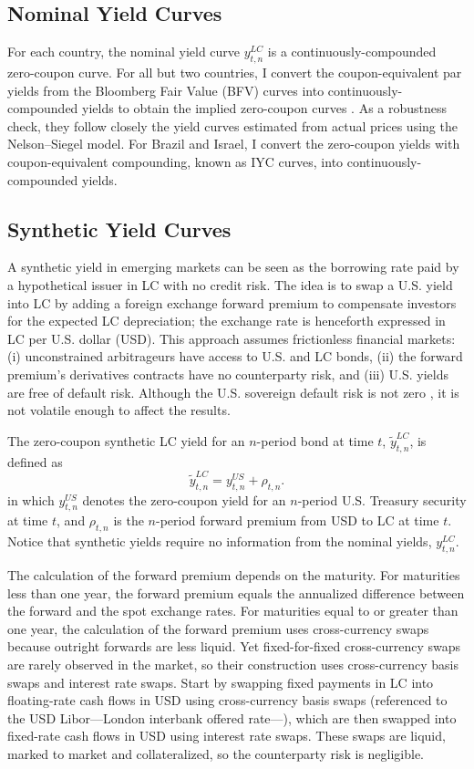 \documentclass[a4paper, 12pt]{article}
\providecommand{\tnr}{n}
\providecommand{\idxt}{t}
\providecommand{\idxs}{\idxt,\tnr}
\providecommand{\yld}{y}
\providecommand{\yLCnom}{\yld_{\idxs} ^{LC}}
\providecommand{\yLCsynt}{\widetilde{\yld}_{\idxs} ^{LC}}
\providecommand{\yUS}{y_{\idxs} ^{US}}
\providecommand{\fwdprm}{\rho_{\idxs}}
\newcommand{\eqyLCsynt}{\yLCsynt = \yUS + \fwdprm}
\begin{document}
\subsection{Nominal Yield Curves} \label{sec:YCnom}
For each country, the nominal yield curve \(\yLCnom\) is a continuously-compounded zero-coupon curve. For all but two countries, I convert the coupon-equivalent par yields from the Bloomberg Fair Value (BFV) curves into continuously-compounded yields to obtain the implied zero-coupon curves \citep[see][]{GSW:2007}. As a robustness check, they follow closely the yield curves estimated from actual prices using the Nelson--Siegel model. For Brazil and Israel, I convert the zero-coupon yields with coupon-equivalent compounding, known as IYC curves, into continuously-compounded yields. 

\subsection{Synthetic Yield Curves} \label{sec:YCsynt}
A synthetic yield in emerging markets can be seen as the borrowing rate paid by a hypothetical issuer in LC with no credit risk. The idea is to swap a U.S. yield into LC by adding a foreign exchange forward premium to compensate investors for the expected LC depreciation; the exchange rate is henceforth expressed in LC per U.S. dollar (USD). This approach assumes frictionless financial markets: (i) unconstrained arbitrageurs have access to U.S. and LC bonds, (ii) the forward premium's derivatives contracts have no counterparty risk, and (iii) U.S. yields are free of default risk. Although the U.S. sovereign default risk is not zero \citep{ACCS:2021}, it is not volatile enough to affect the results. 

The zero-coupon synthetic LC yield for an \(\tnr\)-period bond at time \(\idxt\), \(\yLCsynt\), is defined as
\begin{equation} \label{eq:nLCsynt}
\eqyLCsynt .
\end{equation}
\noindent in which \(\yUS\) denotes the zero-coupon yield for an \(\tnr\)-period U.S. Treasury security at time \(\idxt\), and \(\fwdprm\) is the \(\tnr\)-period forward premium from USD to LC at time \(\idxt\). Notice that synthetic yields require no information from the nominal yields, \(\yLCnom\). 

The calculation of the forward premium depends on the maturity. For maturities less than one year, the forward premium equals the annualized difference between the forward and the spot exchange rates. For maturities equal to or greater than one year, the calculation of the forward premium uses cross-currency swaps because outright forwards are less liquid. Yet fixed-for-fixed cross-currency swaps are rarely observed in the market, so their construction uses cross-currency basis swaps and interest rate swaps. Start by swapping fixed payments in LC into floating-rate cash flows in USD using cross-currency basis swaps (referenced to the USD Libor---London interbank offered rate---), which are then swapped into fixed-rate cash flows in USD using interest rate swaps. These swaps are liquid, marked to market and collateralized, so the counterparty risk is negligible. 
\end{document}
